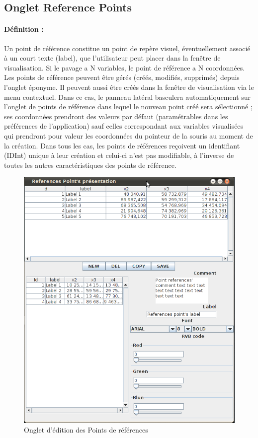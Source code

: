 \documentclass[a4paper]{article}
\begin{document}
\subsection{Onglet Reference Points}\label{sec:onglet:rpt}

\paragraph{Définition :} Un point de référence constitue un point de repère visuel, éventuellement associé à un court texte (label), que l'utilisateur peut placer dans la fenêtre de visualisation. Si le pavage a N variables, le point de référence a N coordonnées. Les points de référence peuvent être gérés (créés, modifiés, supprimés) depuis l'onglet éponyme. Il peuvent aussi être créés dans la fenêtre de visualisation via le menu contextuel. Dans ce cas, le panneau latéral basculera automatiquement sur l'onglet de points de référence dans lequel le nouveau point créé sera sélectionné ; ses coordonnées prendront des valeurs par défaut (paramétrables dans les préférences de l'application) sauf celles correspondant aux variables visualisées qui prendront pour valeur les coordonnées du pointeur de la souris au moment de la création. Dans tous les cas, les points de références reçoivent un identifiant (IDInt) unique à leur création et celui-ci n'est pas modifiable, à l'inverse de toutes les autres caractéristiques des points de référence.

\begin{figure}[h]
  \center
  \includegraphics[scale=0.40]{spec-images/Onglet_PT.png}
  \caption{Onglet d'édition des Points de références}
\end{figure}
\end{document}
